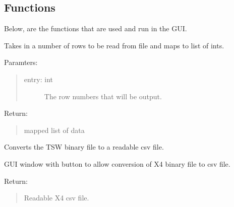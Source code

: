 \documentclass[letterpaper,10pt,english]{sphinxmanual}
\begin{document}
\subsection{Functions}
\label{\detokenize{Library GUI:functions}}
Below, are the functions that are used and run in the GUI.

\label{\detokenize{Library GUI:module-library_gui}}

\begin{fulllineitems}
\label{\detokenize{Library GUI:library_gui.command}}
Takes in a number of rows to be read from file and maps to list of ints.

Paramters:
\begin{quote}
\begin{description}
\item[{entry: int}] \leavevmode
The row numbers that will be output.

\end{description}
\end{quote}

Return:
\begin{quote}

mapped list of data
\end{quote}

\end{fulllineitems}


\begin{fulllineitems}
\label{\detokenize{Library GUI:library_gui.convert_TSW}}
Converts the TSW binary file to a readable csv file.

\end{fulllineitems}


\begin{fulllineitems}
\label{\detokenize{Library GUI:library_gui.convert_x4}}
GUI window with button to allow conversion of X4 binary file to csv file.

Return:
\begin{quote}

Readable X4 csv file.
\end{quote}

\end{fulllineitems}
\end{document}
